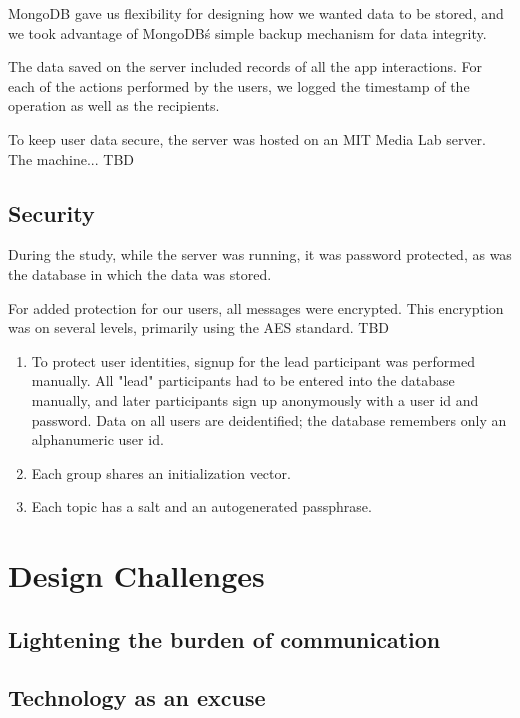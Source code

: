       MongoDB gave us flexibility for designing how we wanted data to be stored,
      and we took advantage of MongoDB\'s simple backup mechanism for data integrity.

      The data saved on the server included records of all the app interactions.
      For each of the actions performed by the users,
      we logged the timestamp of the operation as well as the recipients.

      To keep user data secure, the server was hosted on an MIT Media Lab server.
      The machine... TBD

    \subsection{Security}
      During the study, while the server was running, it was password protected,
      as was the database in which the data was stored.

      For added protection for our users, all messages were encrypted.
      This encryption was on several levels, primarily using the AES standard.
      TBD

      \begin{enumerate}
      \item To protect user identities, signup for the lead participant was performed manually.
      All "lead" participants had to be entered into the database manually,
      and later participants sign up anonymously with a user id and password.
      Data on all users are deidentified;
      the database remembers only an alphanumeric user id.
      \item Each group shares an initialization vector.
      \item Each topic has a salt and an autogenerated passphrase.
      \end{enumerate}



  \section{Design Challenges}
    \subsection{Lightening the burden of communication}

    \subsection{Technology as an excuse}


